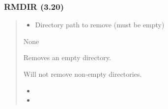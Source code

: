\documentclass[letterpaper,10pt,english]{sphinxmanual}
\begin{document}
\subsubsection{RMDIR (3.20)}
\label{\detokenize{ppl:rmdir-3-20}}\begin{quote}

\sphinxAtStartPar
{}
\begin{description}
\begin{itemize}
\item {} 
\sphinxAtStartPar
{} \textendash{} Directory path to remove (must be empty)

\end{itemize}

\sphinxAtStartPar
None

\sphinxAtStartPar
Removes an empty directory.

\end{description}

\sphinxAtStartPar
{}
\begin{quote}

\begin{sphinxVerbatim}[commandchars=\\\{\}]
 
\end{sphinxVerbatim}
\end{quote}
\begin{description}
\sphinxAtStartPar
Will not remove non‑empty directories.

\begin{itemize}
\item {} 
\sphinxAtStartPar
{}

\item {} 
\sphinxAtStartPar
{}

\end{itemize}

\end{description}
\end{quote}
\end{document}
